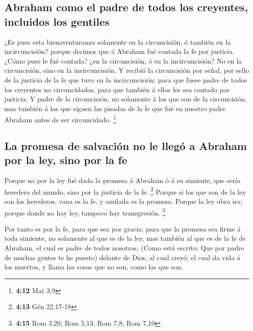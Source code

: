 \hypertarget{abraham-como-el-padre-de-todos-los-creyentes-incluidos-los-gentiles}{%
\subsection{Abraham como el padre de todos los creyentes, incluidos los
gentiles}\label{abraham-como-el-padre-de-todos-los-creyentes-incluidos-los-gentiles}}

 ¿Es pues esta bienaventuranza solamente en la
circuncisión, ó también en la incircuncisión? porque decimos que á
Abraham fué contada la fe por justicia.  ¿Cómo pues le
fué contada? ¿en la circuncisión, ó en la incircuncisión? No en la
circuncisión, sino en la incircuncisión.  Y recibió la
circuncisión por señal, por sello de la justicia de la fe que tuvo en la
incircuncisión: para que fuese padre de todos los creyentes no
circuncidados, para que también á ellos les sea contado por justicia;
 Y padre de la circuncisión, no solamente á los que son
de la circuncisión, mas también á los que siguen las pisadas de la fe
que fué en nuestro padre Abraham antes de ser circuncidado. \footnote{\textbf{4:12}
  Mat 3,9}

\hypertarget{la-promesa-de-salvaciuxf3n-no-le-lleguxf3-a-abraham-por-la-ley-sino-por-la-fe}{%
\subsection{La promesa de salvación no le llegó a Abraham por la ley,
sino por la
fe}\label{la-promesa-de-salvaciuxf3n-no-le-lleguxf3-a-abraham-por-la-ley-sino-por-la-fe}}

 Porque no por la ley fué dada la promesa á Abraham ó á
su simiente, que sería heredero del mundo, sino por la justicia de la
fe. \footnote{\textbf{4:13} Gén 22,17-18}  Porque si los
que son de la ley son los herederos, vana es la fe, y anulada es la
promesa.  Porque la ley obra ira; porque donde no hay
ley, tampoco hay transgresión. \footnote{\textbf{4:15} Rom 3,20; Rom
  5,13; Rom 7,8; Rom 7,10}

 Por tanto es por la fe, para que sea por gracia; para
que la promesa sea firme á toda simiente, no solamente al que es de la
ley, mas también al que es de la fe de Abraham, el cual es padre de
todos nosotros,  (Como está escrito: Que por padre de
muchas gentes te he puesto) delante de Dios, al cual creyó; el cual da
vida á los muertos, y llama las cosas que no son, como las que son.

